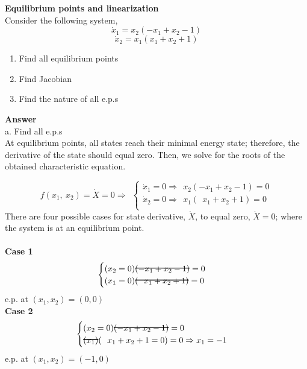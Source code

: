 \documentclass{homeworg}
\newcommand\hcancel[2][black]{\setbox0=\hbox{$#2$}%
\rlap{\raisebox{.45\ht0}{\textcolor{#1}{\rule{\wd0}{1pt}}}}#2}
\begin{document}
\exercise
\noindent
\textbf{Equilibrium points and linearization} \\
Consider the following system,\\
\begin{equation*}
\dot{x}_1 = x_2 (-x_1 + x_2 -1)
\end{equation*}
\begin{equation*}
\dot{x}_2 = x_1 (x_1 + x_2 + 1)
\end{equation*}

\begin{enumerate}[label=(\alph*)]
\item Find all equilibrium points
\item Find Jacobian
\item Find the nature of all e.p.s
\end{enumerate}

\noindent
\textbf{Answer} \\
\noindent
a. Find all e.p.s\\
At equilibrium points, all states reach their minimal energy state; therefore,
the derivative of the state should equal zero. Then, we solve for the roots of
the obtained characteristic equation.

\begin{equation*}
f(x_1,~x_2) = \dot{X} = 0 \Rightarrow~~
  \begin{cases}
    \dot{x}_1 = 0 \Rightarrow~~ x_2(-x_1 + x_2 -1)=0\\
    \dot{x}_2 = 0 \Rightarrow~~ x_1(~~x_1 + x_2 + 1)=0\\
  \end{cases}
\end{equation*}
\noindent
There are four possible cases for state derivative, $\dot{X}$, to equal zero,
$\dot{X}=0$; where the system is at an equilibrium point.\\ \\
\noindent
\textbf{Case 1}
\begin{equation*}
    \begin{cases}
      (x_2=0)\hcancel{(-  x_1 + x_2 -1)}=0\\
      (x_1=0)\hcancel{(~~x_1 + x_2 + 1)}=0\\
    \end{cases}
\end{equation*}
\noindent
e.p. at $(x_1 , x_2) = (0,0)$\\

\noindent
\textbf{Case 2}
\begin{equation*}
    \begin{cases}
      (x_2=0)\hcancel{(-  x_1 + x_2 -1)}=0\\
      \hcancel{(x_1)}(~~x_1 + x_2 + 1 =0)=0 \Rightarrow x_1 = -1
    \end{cases}
\end{equation*}
\noindent
e.p. at $(x_1 , x_2) = (-1,0)$\\
\end{document}
